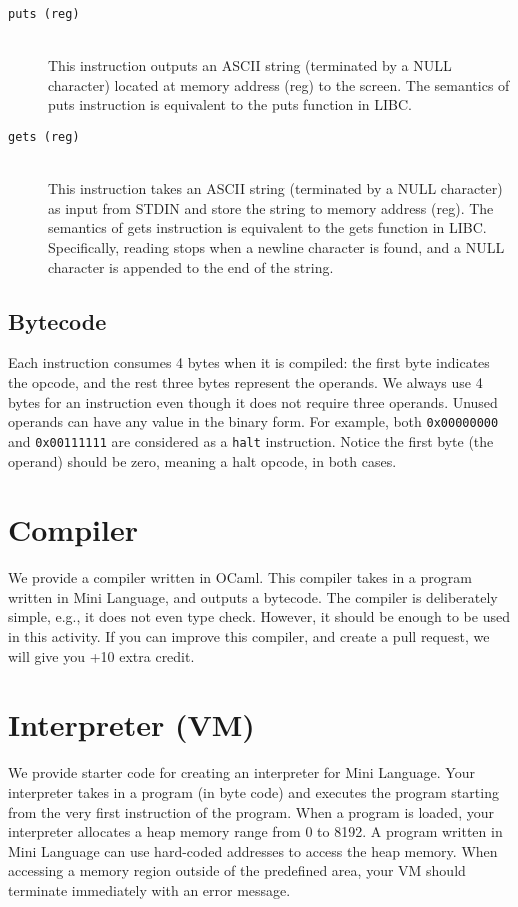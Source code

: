 \documentclass[a4paper, 11pt]{article}
\theoremstyle{definition}
\begin{document}
{\begin{description}
  \item [\texttt{puts (reg)}]~\\
    This instruction outputs an ASCII string (terminated by a NULL
    character) located at memory address (reg) to the screen. The
    semantics of puts instruction is equivalent to the puts function
    in LIBC.

  \item [\texttt{gets (reg)}]~\\
    This instruction takes an ASCII string (terminated by a NULL
    character) as input from STDIN and store the string to memory
    address (reg). The semantics of gets instruction is equivalent to
    the gets function in LIBC. Specifically, reading stops when a
    newline character is found, and a NULL character is appended to
    the end of the string.

\end{description}

\subsection{Bytecode}

Each instruction consumes 4 bytes when it is compiled: the first byte
indicates the opcode, and the rest three bytes represent the operands.
We always use 4 bytes for an instruction even though it does not
require three operands. Unused operands can have any value in the
binary form. For example, both \texttt{0x00000000} and
\texttt{0x00111111} are considered as a \texttt{halt} instruction.
Notice the first byte (the operand) should be zero, meaning a halt
opcode, in both cases.

\section{Compiler}

We provide a compiler written in OCaml. This compiler takes in a
program written in Mini Language, and outputs a bytecode. The compiler
is deliberately simple, e.g., it does not even type check. However, it
should be enough to be used in this activity. If you can improve this
compiler, and create a pull request, we will give you +10 extra
credit.

\section{Interpreter (VM)}

We provide starter code for creating an interpreter for Mini Language.
Your interpreter takes in a program (in byte code) and executes the
program starting from the very first instruction of the program. When
a program is loaded, your interpreter allocates a heap memory range
from 0 to 8192. A program written in Mini Language can use hard-coded
addresses to access the heap memory. When accessing a memory region
outside of the predefined area, your VM should terminate immediately
with an error message.

}
\end{document}
